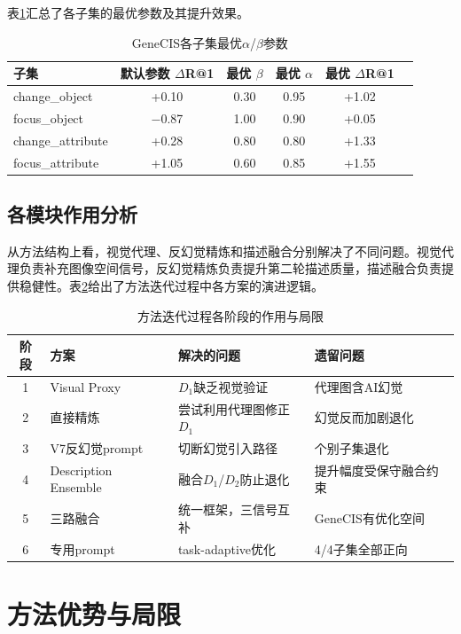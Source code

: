 \documentclass[12pt,a4paper,UTF8,oneside,openany]{ctexrep}
\begin{document}
表\ref{tab:grid_summary}汇总了各子集的最优参数及其提升效果。

\begin{table}[htbp]
\centering
\caption{GeneCIS各子集最优$\alpha$/$\beta$参数}
\label{tab:grid_summary}
\small
\begin{tabular}{lccccc}
\toprule
子集 & 默认参数 $\Delta$R@1 & 最优 $\beta$ & 最优 $\alpha$ & 最优 $\Delta$R@1 \\
\midrule
change\_object    & +0.10 & 0.30 & 0.95 & +1.02 \\
focus\_object     & $-$0.87 & 1.00 & 0.90 & +0.05 \\
change\_attribute & +0.28 & 0.80 & 0.80 & +1.33 \\
focus\_attribute  & +1.05 & 0.60 & 0.85 & +1.55 \\
\bottomrule
\end{tabular}
\end{table}


\subsection{各模块作用分析}

从方法结构上看，视觉代理、反幻觉精炼和描述融合分别解决了不同问题。视觉代理负责补充图像空间信号，反幻觉精炼负责提升第二轮描述质量，描述融合负责提供稳健性。表\ref{tab:ablation}给出了方法迭代过程中各方案的演进逻辑。

\begin{table}[htbp]
\centering
\caption{方法迭代过程各阶段的作用与局限}
\label{tab:ablation}
\footnotesize
\begin{tabular}{clp{4.5cm}p{4.5cm}}
\toprule
阶段 & 方案 & 解决的问题 & 遗留问题 \\
\midrule
1 & Visual Proxy & $D_1$缺乏视觉验证 & 代理图含AI幻觉 \\
2 & 直接精炼 & 尝试利用代理图修正$D_1$ & 幻觉反而加剧退化 \\
3 & V7反幻觉prompt & 切断幻觉引入路径 & 个别子集退化 \\
4 & Description Ensemble & 融合$D_1$/$D_2$防止退化 & 提升幅度受保守融合约束 \\
5 & 三路融合 & 统一框架，三信号互补 & GeneCIS有优化空间 \\
6 & 专用prompt & task-adaptive优化 & 4/4子集全部正向 \\
\bottomrule
\end{tabular}
\end{table}


\section{方法优势与局限}
\end{document}
